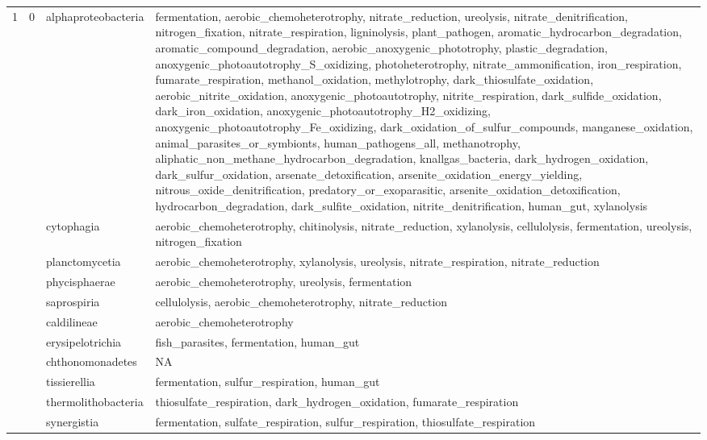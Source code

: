 \documentclass{article}
\begin{document}
\begin{longtable}{|l|c|l|>{\raggedright\arraybackslash}p{6cm}|}
1 & 0 & alphaproteobacteria & fermentation, aerobic\_chemoheterotrophy, nitrate\_reduction, ureolysis, nitrate\_denitrification, nitrogen\_fixation, nitrate\_respiration, ligninolysis, plant\_pathogen, aromatic\_hydrocarbon\_degradation, aromatic\_compound\_degradation, aerobic\_anoxygenic\_phototrophy, plastic\_degradation, anoxygenic\_photoautotrophy\_S\_oxidizing, photoheterotrophy, nitrate\_ammonification, iron\_respiration, fumarate\_respiration, methanol\_oxidation, methylotrophy, dark\_thiosulfate\_oxidation, aerobic\_nitrite\_oxidation, anoxygenic\_photoautotrophy, nitrite\_respiration, dark\_sulfide\_oxidation, dark\_iron\_oxidation, anoxygenic\_photoautotrophy\_H2\_oxidizing, anoxygenic\_photoautotrophy\_Fe\_oxidizing, dark\_oxidation\_of\_sulfur\_compounds, manganese\_oxidation, animal\_parasites\_or\_symbionts, human\_pathogens\_all, methanotrophy, aliphatic\_non\_methane\_hydrocarbon\_degradation, knallgas\_bacteria, dark\_hydrogen\_oxidation, dark\_sulfur\_oxidation, arsenate\_detoxification, arsenite\_oxidation\_energy\_yielding, nitrous\_oxide\_denitrification, predatory\_or\_exoparasitic, arsenite\_oxidation\_detoxification, hydrocarbon\_degradation, dark\_sulfite\_oxidation, nitrite\_denitrification, human\_gut, xylanolysis\\
\cline{3-4}
 &  & cytophagia & aerobic\_chemoheterotrophy, chitinolysis, nitrate\_reduction, xylanolysis, cellulolysis, fermentation, ureolysis, nitrogen\_fixation\\
\cline{3-4}
 &  & planctomycetia & aerobic\_chemoheterotrophy, xylanolysis, ureolysis, nitrate\_respiration, nitrate\_reduction\\
\cline{3-4}
 &  & phycisphaerae & aerobic\_chemoheterotrophy, ureolysis, fermentation\\
\cline{3-4}
 &  & saprospiria & cellulolysis, aerobic\_chemoheterotrophy, nitrate\_reduction\\
\cline{3-4}
 &  & caldilineae & aerobic\_chemoheterotrophy\\
\cline{3-4}
 &  & erysipelotrichia & fish\_parasites, fermentation, human\_gut\\
\cline{3-4}
 &  & chthonomonadetes & NA\\
\cline{3-4}
 &  & tissierellia & fermentation, sulfur\_respiration, human\_gut\\
\cline{3-4}
 &  & thermolithobacteria & thiosulfate\_respiration, dark\_hydrogen\_oxidation, fumarate\_respiration\\
\cline{3-4}
 &  & synergistia & fermentation, sulfate\_respiration, sulfur\_respiration, thiosulfate\_respiration\\

\end{longtable}
\end{document}
